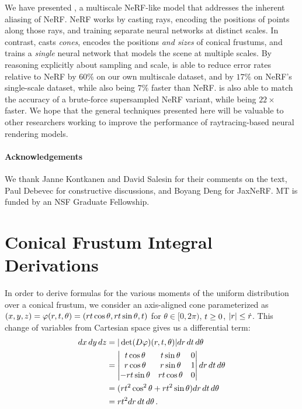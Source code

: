 \documentclass[10pt,twocolumn,letterpaper]{article}
\begin{document}
We have presented \shortmodelnamelower, a multiscale NeRF-like model that addresses the inherent aliasing of NeRF. NeRF works by casting rays, encoding the positions of points along those rays, and training separate neural networks at distinct scales. In contrast, \shortmodelnamelower casts \emph{cones}, encodes the positions \emph{and sizes} of conical frustums, and trains a \emph{single} neural network that models the scene at multiple scales. 
By reasoning explicitly about sampling and scale, \shortmodelnamelower is able to reduce error rates relative to NeRF by $60\%$ on our own multiscale dataset, and by $17\%$ on NeRF's single-scale dataset, while also being $7\%$ faster than NeRF.
\shortmodelname is also able to match the accuracy of a brute-force supersampled NeRF variant, while being $22 \times$ faster.
We hope that the general techniques presented here will be valuable to other researchers working to improve the performance of raytracing-based neural rendering models.


\paragraph{Acknowledgements}
We thank Janne Kontkanen and David Salesin for their comments on the text, Paul Debevec for constructive discussions, and Boyang Deng for JaxNeRF. MT is funded by an NSF Graduate Fellowship.

\clearpage

{\small


}

\clearpage
\appendix

\section{Conical Frustum Integral Derivations}

In order to derive formulas for the various moments of the uniform distribution over a conical frustum, we consider an axis-aligned cone parameterized as $(x,y,z) = \varphi(r, t, \theta) = (r t \cos\theta, r t \sin \theta, t)$ for $\theta \in [0, 2\pi)$, $t \geq 0$, $|r| \leq \dot r$. 
This change of variables from Cartesian space gives us a differential term:
\begin{align}
    dx \, dy \, dz &= |\det(D\varphi)(r, t, \theta)| dr\, dt \, d\theta \\
    &= 
    \begin{vmatrix}
    t \cos \theta & t \sin \theta & 0 \\
    r \cos \theta & r \sin \theta & 1 \\
    -rt\sin\theta & rt\cos\theta & 0 \\
    \end{vmatrix} dr\, dt \, d\theta \\
    &= 
    (rt^2 \cos^2 \theta + rt^2 \sin\theta)dr\, dt \, d\theta \\
    &= rt^2 dr\, dt \, d\theta \, .
\end{align}
\end{document}
